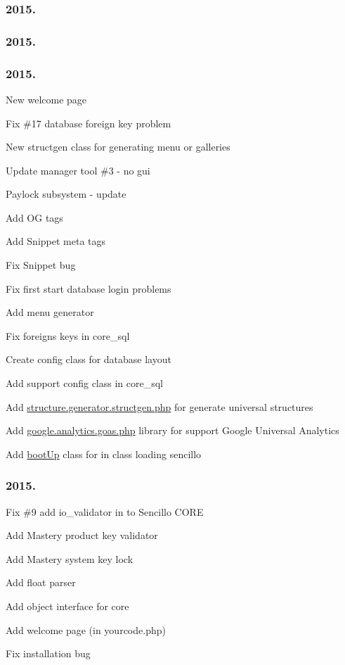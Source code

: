 \subsubsection*{2015.}

\subsubsection*{2015.}

\subsubsection*{2015.}


\begin{DoxyEnumerate}
\item New welcome page
\item Fix \#17 database foreign key problem
\item New structgen class for generating menu or galleries
\item Update manager tool \#3 -\/ no gui
\item Paylock subsystem -\/ update
\item Add O\-G tags
\item Add Snippet meta tags
\item Fix Snippet bug
\item Fix first start database login problems
\item Add menu generator
\item Fix foreigns keys in core\-\_\-sql
\item Create config class for database layout
\item Add support config class in core\-\_\-sql
\item Add \hyperlink{structure_8generator_8structgen_8php_source}{structure.\-generator.\-structgen.\-php} for generate universal structures
\item Add \hyperlink{google_8analytics_8goas_8php_source}{google.\-analytics.\-goas.\-php} library for support Google Universal Analytics
\item Add \hyperlink{classboot_up}{boot\-Up} class for in class loading sencillo
\end{DoxyEnumerate}

\subsubsection*{2015.}


\begin{DoxyEnumerate}
\item Fix \#9 add io\-\_\-validator in to Sencillo C\-O\-R\-E
\item Add Mastery product key validator
\item Add Mastery system key lock
\item Add float parser
\item Add object interface for core
\item Add welcome page (in yourcode.\-php)
\item Fix installation bug
\end{DoxyEnumerate}

